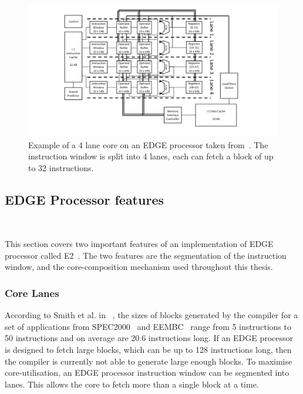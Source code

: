  \begin{figure}[t]
 \center
 \includegraphics[width=1\textwidth]{background/graphics/edge_lanes.pdf}
 \vspace{-4em}
 \caption{Example of a 4 lane core on an EDGE processor taken from~\cite{putnam2010e2}. The instruction window is split into 4 lanes, each can fetch a block of up to 32 instructions.}\label{fig:e2segment}
\vspace{-1em}
 \end{figure}

\subsection{EDGE Processor features}~\label{sec:edge_arch}

This section covers two important features of an implementation of EDGE processor called E2~\cite{putnam2010e2}.
The two features are the segmentation of the instruction window, and the core-composition mechanism used throughout this thesis.

\subsubsection{Core Lanes} 

According to Smith et al. in ~\cite{smith2006edge}, the sizes of blocks generated by the compiler for a set of applications from SPEC2000~\cite{spec2000} and EEMBC~\cite{eembc} range from 5 instructions to 50 instructions and on average are 20.6 instructions long.
If an EDGE processor is designed to fetch large blocks, which can be up to 128 instructions long, then the compiler is currently not able to generate large enough blocks.
To maximise core-utilisation, an EDGE processor instruction window can be segmented into lanes.
This allows the core to fetch more than a single block at a time.

